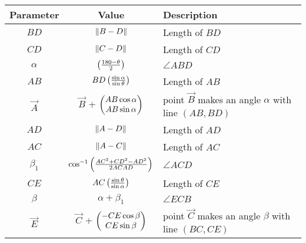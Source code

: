 \begin{tabular}{|c|c|p{5cm}|}
\hline
\textbf{Parameter} & \textbf{Value} & \textbf{Description} \\
\hline
	$BD$ & $\left\lVert B-D\right\rVert$ & Length of $BD$ \\
\hline
	$CD$ & $\left\lVert C-D\right\rVert$ & Length of $CD$ \\
\hline
	$\alpha$ & $\left(\frac{180 - \theta}{2}\right)$ & $\angle ABD$ \\
\hline
	$AB$ & $BD \left(\frac{\sin \alpha}{\sin \theta}\right)$ &  Length of $AB$ \\
\hline
	$\vec{A}$ & $\vec{B}$ + $\begin{pmatrix}AB \cos \alpha  \\ AB \sin \alpha\end{pmatrix}$ & point $\vec{B}$ makes an angle $\alpha$  with line $(AB ,BD)$  \\
\hline
	$AD$ & $\left\lVert A-D\right\rVert$ & Length of $AD$ \\
\hline
	$AC$ & $\left\lVert A-C\right\rVert$ & Length of $AC$ \\
\hline
	  
	$\beta_1$ & $\cos^{-1} \left(\frac{AC^2 +CD^2 - AD^2}{2 AC AD}\right)$ & $\angle ACD$ \\
\hline
	$CE$ & ${AC} \left(\frac{\sin \theta}{\sin \alpha}\right)$ &  Length of $CE$ \\
\hline
	$\beta$ & $\alpha + \beta_1$ & $\angle ECB$\\

\hline
	$\vec{E}$ & $\vec{C}$ + $\begin{pmatrix}-CE \cos \beta  \\ CE \sin \beta\end{pmatrix}$ & point $\vec{C}$ makes an angle $\beta$  with line $(BC ,CE)$  \\
\hline

\end{tabular}
